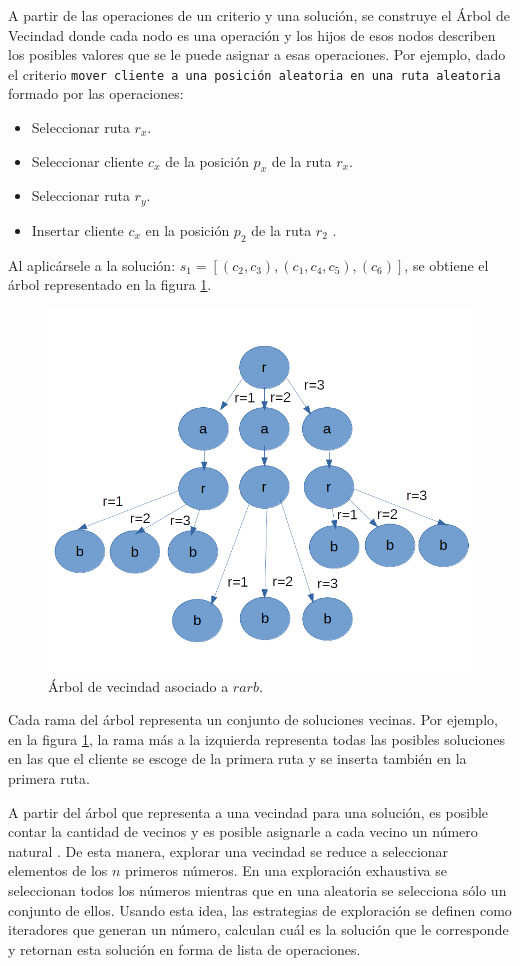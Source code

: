 A partir de las operaciones de un criterio y una solución, se construye el Árbol de Vecindad donde cada nodo es una operación y los hijos de esos nodos describen los posibles valores que se le puede asignar a esas operaciones. Por ejemplo, dado el criterio \texttt{mover cliente a una posición aleatoria en una ruta aleatoria} formado por las operaciones: 

\begin{itemize}
	\item Seleccionar ruta \texttt{$r_x$}.
	\item Seleccionar cliente \texttt{$c_x$} de la posición \texttt{$p_x$} de la ruta \texttt{$r_x$}.
	\item Seleccionar ruta \texttt{$r_y$}.
	\item Insertar cliente \texttt{$c_x$} en la posición \texttt{$p_2$} de la ruta \texttt{$r_2$} .
\end{itemize}

Al aplicársele a la solución: $s_1 = [(c_2,c_3), (c_1,c_4,c_5), (c_6)]$, se obtiene el árbol representado en la figura \ref{fig:neigh-tree}.


\begin{figure}
	\centering
	\includegraphics[width=0.7\linewidth]{Graphics/Neigh-Tree}
	\caption{Árbol de vecindad asociado a $rarb$.}
	\label{fig:neigh-tree}
\end{figure}

Cada rama del árbol representa un conjunto de soluciones vecinas. Por ejemplo, en la figura \ref{fig:neigh-tree}, la rama más a la izquierda representa todas las posibles soluciones en las que el cliente se escoge de la primera ruta y se inserta también en la primera ruta.

A partir del árbol que representa a una vecindad para una solución, es posible contar la cantidad de vecinos y es posible asignarle a cada vecino un número natural \cite{Hector}. De esta manera, explorar una vecindad se reduce a seleccionar elementos de los $n$ primeros números. En una exploración exhaustiva se seleccionan todos los números mientras que en una aleatoria se selecciona sólo un conjunto de ellos. Usando esta idea, las estrategias de exploración se definen como iteradores que generan un número, calculan cuál es la solución que le corresponde y retornan esta solución en forma de lista de operaciones.

